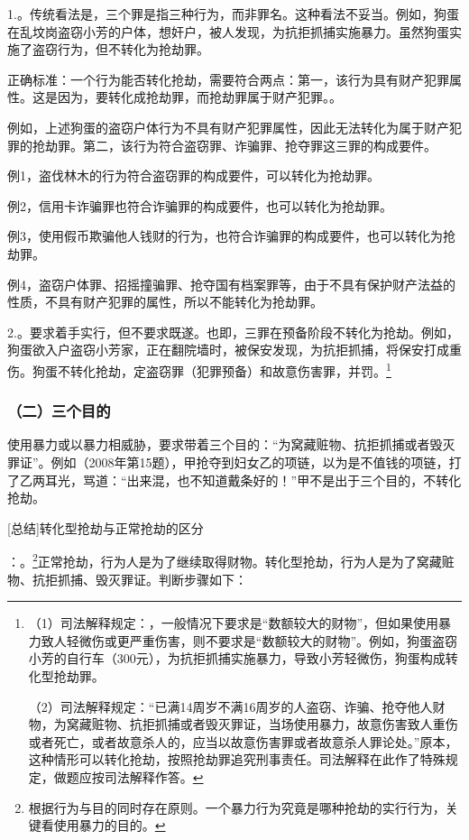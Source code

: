 1.。传统看法是，三个罪是指三种行为，而非罪名。这种看法不妥当。例如，狗蛋在乱坟岗盗窃小芳的户体，想奸户，被人发现，为抗拒抓捕实施暴力。虽然狗蛋实施了盗窃行为，但不转化为抢劫罪。

正确标准：一个行为能否转化抢劫，需要符合两点：第一，该行为具有财产犯罪属性。这是因为，要转化成抢劫罪，而抢劫罪属于财产犯罪。。

例如，上述狗蛋的盗窃户体行为不具有财产犯罪属性，因此无法转化为属于财产犯罪的抢劫罪。第二，该行为符合盗窃罪、诈骗罪、抢夺罪这三罪的构成要件。

例1，盗伐林木的行为符合盗窃罪的构成要件，可以转化为抢劫罪。

例2，信用卡诈骗罪也符合诈骗罪的构成要件，也可以转化为抢劫罪。

例3，使用假币欺骗他人钱财的行为，也符合诈骗罪的构成要件，也可以转化为抢劫罪。

例4，盗窃户体罪、招摇撞骗罪、抢夺国有档案罪等，由于不具有保护财产法益的性质，不具有财产犯罪的属性，所以不能转化为抢劫罪。

2.。要求着手实行，但不要求既遂。也即，三罪在预备阶段不转化为抢劫。例如，狗蛋欲入户盗窃小芳家，正在翻院墙时，被保安发现，为抗拒抓捕，将保安打成重伤。狗蛋不转化抢劫，定盗窃罪（犯罪预备）和故意伤害罪，并罚。\footnote{（1）司法解释规定：，一般情况下要求是“数额较大的财物”，但如果使用暴力致人轻微伤或更严重伤害，则不要求是“数额较大的财物”。例如，狗蛋盗窃小芳的自行车（300元），为抗拒抓捕实施暴力，导致小芳轻微伤，狗蛋构成转化型抢劫罪。

（2）司法解释规定：“已满14周岁不满16周岁的人盗窃、诈骗、抢夺他人财物，为窝藏赃物、抗拒抓捕或者毁灭罪证，当场使用暴力，故意伤害致人重伤或者死亡，或者故意杀人的，应当以故意伤害罪或者故意杀人罪论处。”原本，这种情形可以转化抢劫，按照抢劫罪追究刑事责任。司法解释在此作了特殊规定，做题应按司法解释作答。}

\subsubsection*{（二）三个目的}

使用暴力或以暴力相威胁，要求带着三个目的：“为窝藏赃物、抗拒抓捕或者毁灭罪证”。例如（2008年第15题），甲抢夺到妇女乙的项链，以为是不值钱的项链，打了乙两耳光，骂道：“出来混，也不知道戴条好的！”甲不是出于三个目的，不转化抢劫。

[总结]转化型抢劫与正常抢劫的区分

：。\footnote{根据行为与目的同时存在原则。一个暴力行为究竟是哪种抢劫的实行行为，关键看使用暴力的目的。}正常抢劫，行为人是为了继续取得财物。转化型抢劫，行为人是为了窝藏赃物、抗拒抓捕、毁灭罪证。判断步骤如下：

